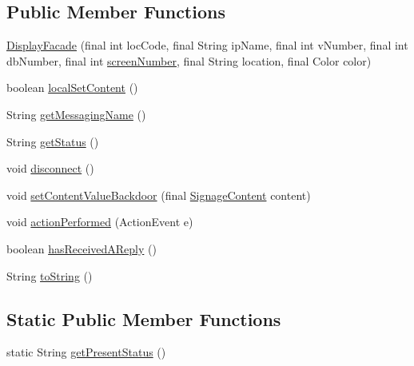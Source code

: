 \subsection*{Public Member Functions}
\begin{DoxyCompactItemize}
\item 
\hyperlink{classgov_1_1fnal_1_1ppd_1_1dd_1_1display_1_1DisplayFacade_a44ab17c633b7d08fbe62ebfa8ba9596e}{Display\-Facade} (final int loc\-Code, final String ip\-Name, final int v\-Number, final int db\-Number, final int \hyperlink{classgov_1_1fnal_1_1ppd_1_1dd_1_1display_1_1DisplayImpl_ace620614bde13cee492129c27f38db4e}{screen\-Number}, final String location, final Color color)
\item 
boolean \hyperlink{classgov_1_1fnal_1_1ppd_1_1dd_1_1display_1_1DisplayFacade_aa103a2459e11731f78208f581d6df230}{local\-Set\-Content} ()
\item 
String \hyperlink{classgov_1_1fnal_1_1ppd_1_1dd_1_1display_1_1DisplayFacade_ad22aeb5c8a46e05ba8afee5f85fa03c4}{get\-Messaging\-Name} ()
\item 
String \hyperlink{classgov_1_1fnal_1_1ppd_1_1dd_1_1display_1_1DisplayFacade_a52ef55dc309ff13a29e56e60df0ec10a}{get\-Status} ()
\item 
void \hyperlink{classgov_1_1fnal_1_1ppd_1_1dd_1_1display_1_1DisplayFacade_a97295fbdea4502156b438b39b498568f}{disconnect} ()
\item 
void \hyperlink{classgov_1_1fnal_1_1ppd_1_1dd_1_1display_1_1DisplayFacade_a98d5e27ef58b716f26938e98d47d3f2f}{set\-Content\-Value\-Backdoor} (final \hyperlink{interfacegov_1_1fnal_1_1ppd_1_1dd_1_1signage_1_1SignageContent}{Signage\-Content} content)
\item 
void \hyperlink{classgov_1_1fnal_1_1ppd_1_1dd_1_1display_1_1DisplayFacade_afaa48e979816a840fea8dbffbe5300c7}{action\-Performed} (Action\-Event e)
\item 
boolean \hyperlink{classgov_1_1fnal_1_1ppd_1_1dd_1_1display_1_1DisplayFacade_a007114c29a3b378a97f389f0dc897786}{has\-Received\-A\-Reply} ()
\item 
String \hyperlink{classgov_1_1fnal_1_1ppd_1_1dd_1_1display_1_1DisplayFacade_a682817a09de18ad0065d76b52baab114}{to\-String} ()
\end{DoxyCompactItemize}
\subsection*{Static Public Member Functions}
\begin{DoxyCompactItemize}
\item 
static String \hyperlink{classgov_1_1fnal_1_1ppd_1_1dd_1_1display_1_1DisplayFacade_a78b803ae9cb502e09f8bbd65d7fa741e}{get\-Present\-Status} ()
\end{DoxyCompactItemize}
